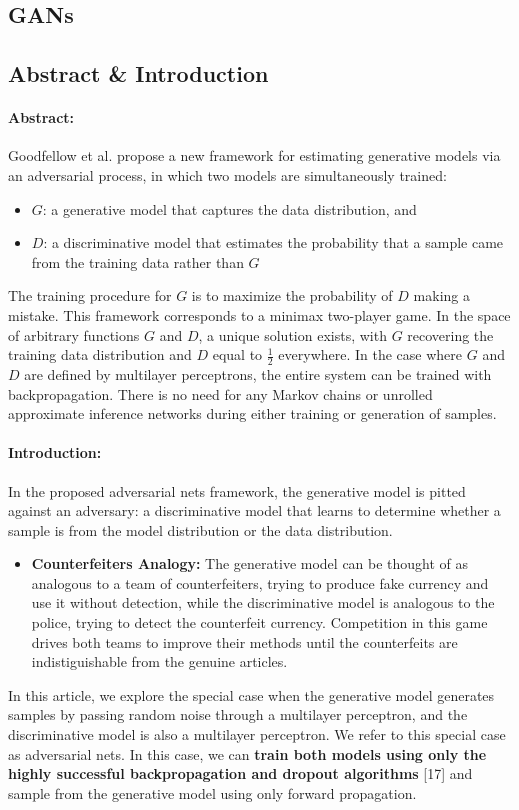 \subsection{GANs \cite{goodfellow2014generative}}

\subsection*{Abstract \& Introduction}

\paragraph*{Abstract: } Goodfellow et al. propose a new framework for estimating generative models via an adversarial process, in which two models are simultaneously trained:
\begin{itemize}
\item
	$G$: a generative model that captures the data distribution, and
\item
	$D$: a discriminative model that estimates the probability that a sample came from the training data rather than $G$
\end{itemize}
The training procedure for $G$ is to maximize the probability of $D$ making a mistake. This framework corresponds to a minimax two-player game. In the space of arbitrary functions $G$ and $D$, a unique solution exists, with $G$ recovering the training data distribution and $D$ equal to \texttt{$\frac{1}{2}$} everywhere. In the case where $G$ and $D$ are defined by multilayer perceptrons, the entire system can be trained with backpropagation. There is no need for any Markov chains or unrolled approximate inference networks during either training or generation of samples.


\paragraph*{Introduction: }

In the proposed adversarial nets framework, the generative model is pitted against an adversary: a discriminative model that learns to determine whether a sample is from the model distribution or the data distribution.
\begin{itemize}
\item \textbf{Counterfeiters Analogy: } The generative model can be thought of as analogous to a team of counterfeiters, trying to produce fake currency and use it without detection, while the discriminative model is analogous to the police, trying to detect the counterfeit currency. Competition in this game drives both teams to improve their methods until the counterfeits are indistiguishable from the genuine articles.
\end{itemize}
In this article, we explore the special case when the generative model generates samples by passing random noise through a multilayer perceptron, and the discriminative model is also a multilayer perceptron. We refer to this special case as adversarial nets. In this case, we can \textbf{train both models using only the highly successful backpropagation and dropout algorithms} [17] and sample from the generative model using only forward propagation.

